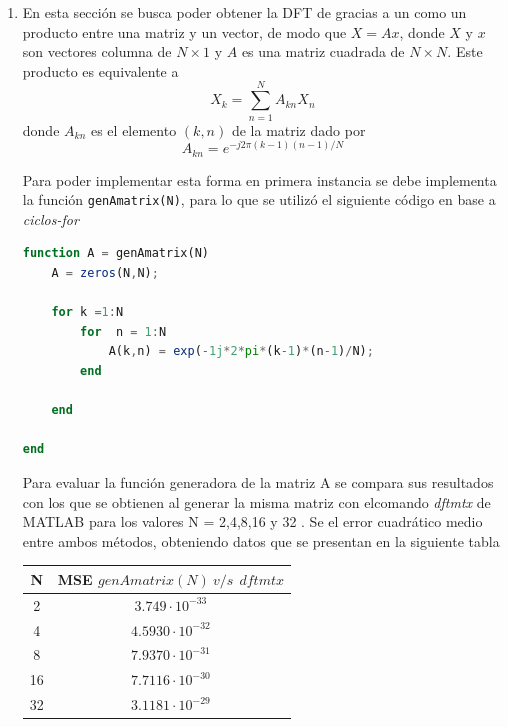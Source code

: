   \begin{enumerate}
      \item En esta sección se busca poder obtener la DFT de gracias a un  como un producto entre una matriz y un vector, de modo que $X = Ax$, donde $X$ y $x$ son vectores columna de $N\times1$ y $A$ es una matriz cuadrada de $N\times N$. Este producto es equivalente a $$X_k = \sum_{n=1}^{N}A_{k n}X_n$$
      donde $A_{k n}$ es el elemento $(k, n)$ de la matriz dado por 
      $$A_{k n} =e^{-j 2 \pi (k-1)(n-1)/N}$$
      
      Para poder implementar esta forma en primera instancia se debe implementa la función \texttt{genAmatrix(N)}, para lo que se utilizó el siguiente código en base a \textit{ciclos-for}
      
      \begin{lstlisting}[language = octave]
function A = genAmatrix(N)
    A = zeros(N,N);
    
    for k =1:N
        for  n = 1:N
            A(k,n) = exp(-1j*2*pi*(k-1)*(n-1)/N);
        end
        
    end
    
end

      \end{lstlisting}

  
  
  Para evaluar la función generadora de la matriz A se compara sus resultados con los que se obtienen al generar la misma matriz con elcomando \textit{dftmtx} de MATLAB para los valores N = 2,4,8,16 y  32 . Se  el error cuadrático medio entre ambos métodos, obteniendo datos que se presentan en la siguiente tabla
  
  
  
 \begin{table}[H]
        \centering
        \begin{tabular}{|c|c|}
        \hline
         N    & MSE $genAmatrix(N) ~ v/s~~ dftmtx$  \\
         \hline
         2  & $ 3.749\cdot 10^{-33}$ \\
         \hline
        4  &   $4.5930\cdot 10^{-32}$ \\
         \hline
        8  & $7.9370\cdot 10^{-31} $\\
         \hline
        
         16&    $7.7116\cdot 10^{-30} $\\
         \hline
         
         32&    $ 3.1181\cdot 10^{-29} $\\
         \hline




\end{tabular}
\end{table}
\end{enumerate}
